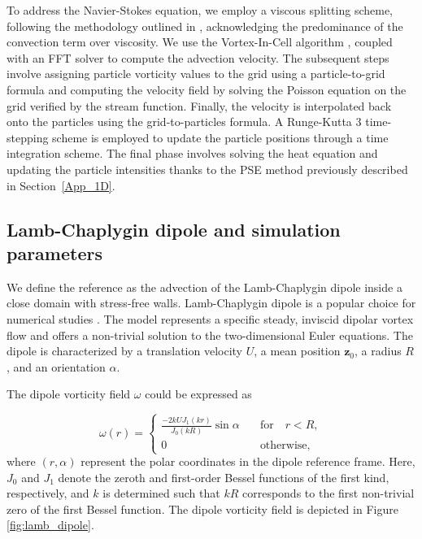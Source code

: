 To address the Navier-Stokes equation, we employ a viscous splitting scheme, following the methodology outlined in \cite{cottet_1990}, acknowledging the predominance of the convection term over viscosity. We use the Vortex-In-Cell algorithm \cite{christiansen_1973, birdsall_1969}, coupled with an FFT solver to compute the advection velocity. The subsequent steps involve assigning particle vorticity values to the grid using a particle-to-grid formula and computing the velocity field by solving the Poisson equation on the grid verified by the stream function. Finally, the velocity is interpolated back onto the particles using the grid-to-particles formula. A Runge-Kutta 3 time-stepping scheme is employed to update the particle positions through a time integration scheme. The final phase involves solving the heat equation and updating the particle intensities thanks to the PSE method previously described in Section~\ref{App_1D}.

\subsection{Lamb-Chaplygin dipole and simulation parameters}

We define the reference as the advection of the Lamb-Chaplygin dipole inside a close domain with stress-free walls. Lamb-Chaplygin dipole is a popular choice for numerical studies \cite{orlandi_vortex_1990}. The model represents a specific steady, inviscid dipolar vortex flow and offers a non-trivial solution to the two-dimensional Euler equations. The dipole is characterized by a translation velocity $U$, a mean position $\bm{z}_0$, a radius $R$, and an orientation $\alpha$.

The dipole vorticity field $\omega$ could be expressed as

\begin{equation*}
    \omega(r) = \begin{cases}
        \frac{-2 k U J_1(kr)}{J_0(kR)} \sin \alpha \quad & \text{for} \quad  r < R, \\
        0 \quad                                          & \text{otherwise},
    \end{cases}
\end{equation*}where $(r, \alpha)$ represent the polar coordinates in the dipole reference frame. Here, $J_0$ and $J_1$ denote the zeroth and first-order Bessel functions of the first kind, respectively, and $k$ is determined such that $kR$ corresponds to the first non-trivial zero of the first Bessel function. The dipole vorticity field is depicted in Figure \ref{fig:lamb_dipole}.


